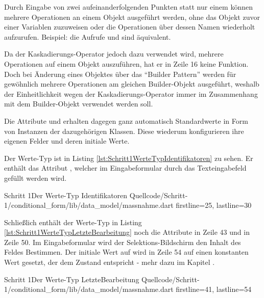 Durch Eingabe von zwei aufeinanderfolgenden Punkten  statt nur einem  können mehrere Operationen an einem Objekt ausgeführt werden, ohne  das Objekt zuvor einer Variablen zuzuweisen oder die Operationen über dessen Namen wiederholt aufzurufen. Beispiel: die Aufrufe   und  sind äquivalent.

Da der Kaskadierungs-Operator jedoch dazu verwendet wird, mehrere Operationen auf einem Objekt auszuführen, hat er in Zeile 16 keine Funktion.
Doch bei Änderung eines Objektes über das \enquote{Builder Pattern} werden für gewöhnlich mehrere Operationen am gleichen Builder-Objekt ausgeführt, weshalb der Einheitlichkeit wegen der Kaskadierungs-Operator immer im Zusammenhang mit dem Builder-Objekt verwendet werden soll.

Die Attribute  und   erhalten dagegen ganz automatisch Standardwerte in Form von Instanzen der dazugehörigen Klassen.
Diese wiederum konfigurieren ihre eigenen Felder und deren initiale Werte.



Der Werte-Typ  ist in Listing \ref{lst:Schritt1WerteTypIdentifikatoren} zu sehen.
Er enthält das Attribut , welcher im Eingabeformular durch das Texteingabefeld gefüllt werden wird.

\begin{alexlisting}{Schritt 1}{Der Werte-Typ Identifikatoren}
  {Quellcode/Schritt-1/conditional_form/lib/data_model/massnahme.dart}
  {firstline=25, lastline=30}
  \label{lst:Schritt1WerteTypIdentifikatoren}
\end{alexlisting}

Schließlich enthält der Werte-Typ  in Listing \ref{lst:Schritt1WerteTypLetzteBearbeitung} noch die Attribute  in Zeile 43 und  in Zeile 50.
Im Eingabeformular wird der Selektions-Bildschirm den Inhalt des Feldes  Bestimmen.
Der initiale Wert auf wird in Zeile 54 auf einen konstanten Wert gesetzt, der dem Zustand  entspricht - mehr dazu im Kapitel .

\begin{alexlisting}{Schritt 1}{Der Werte-Typ LetzteBearbeitung}
  {Quellcode/Schritt-1/conditional_form/lib/data_model/massnahme.dart}
  {firstline=41, lastline=54}
  \label{lst:Schritt1WerteTypLetzteBearbeitung}
\end{alexlisting}

